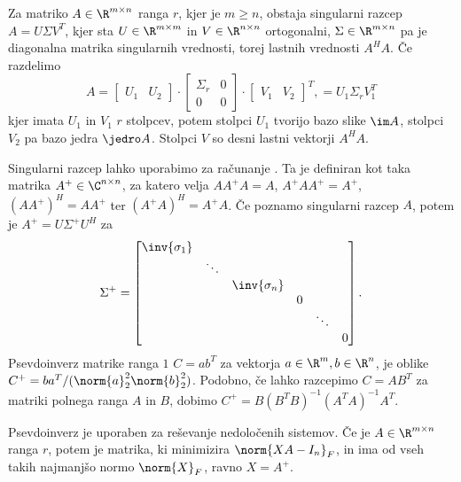 
Za matriko $A \in \R^{m \times n}$ ranga $r$, kjer je $m \ge n$, obstaja
singularni razcep $A = U \Sigma V^T$, kjer sta $U \in \R^{m \times m}$ in $V \in
\R^{n \times n}$ ortogonalni, $\Sigma \in \R^{m \times n}$ pa je diagonalna
matrika singularnih vrednosti, torej lastnih vrednosti $A^H A$.
Če razdelimo
\[
  A =
  \begin{bmatrix}
	U_1 & U_2
  \end{bmatrix}
  \cdot
  \begin{bmatrix}
	\Sigma_r & 0 \\ 0 & 0
  \end{bmatrix}
  \cdot
  \begin{bmatrix}
	V_1 & V_2
  \end{bmatrix}^T,
  = U_1 \Sigma_r V_1^T
\]
kjer imata $U_1$ in $V_1$ $r$ stolpcev, potem stolpci $U_1$ tvorijo bazo slike
$\im A$, stolpci $V_2$ pa bazo jedra $\jedro A$.
Stolpci $V$ so desni lastni vektorji $A^H A$.

Singularni razcep lahko uporabimo za računanje .
Ta je definiran kot taka matrika $A^+ \in \C^{n\times n}$, za katero velja $A
A^+ A = A$, $A^+ A A^+ = A^+$, $(A A^+)^H = A A^+$ ter $(A^+ A)^H = A^+ A$.
Če poznamo singularni razcep $A$, potem je $A^+ = U \Sigma^+ U^H$ za
\[
  \Sigma^+ =
  \begin{bmatrix}
	\inv{\sigma_1} &        &                &   &        &     \\
	               & \ddots &                &   &        &     \\
	               &        & \inv{\sigma_n} &   &        &     \\
	               &        &                & 0 &        &     \\
	               &        &                &   & \ddots &     \\
	               &        &                &   &  & 0
  \end{bmatrix}.
\]
Psevdoinverz matrike ranga $1$ $C = a b^T$ za vektorja $a \in \R^m, b \in \R^n$,
je oblike $C^+ = b a^T / (\norm{a}_2^2 \norm{b}_2^2)$.
Podobno, če lahko razcepimo $C = A B^T$ za matriki polnega ranga $A$ in $B$,
dobimo $C^+ = B (B^T B)^{-1} (A^T A)^{-1} A^T$.

Psevdoinverz je uporaben za reševanje nedoločenih sistemov.
Če je $A \in \R^{m \times n}$ ranga $r$, potem je matrika, ki minimizira
$\norm{X A - I_n}_F$, in ima od vseh takih najmanjšo normo $\norm{X}_F$, ravno
$X = A^+$.


